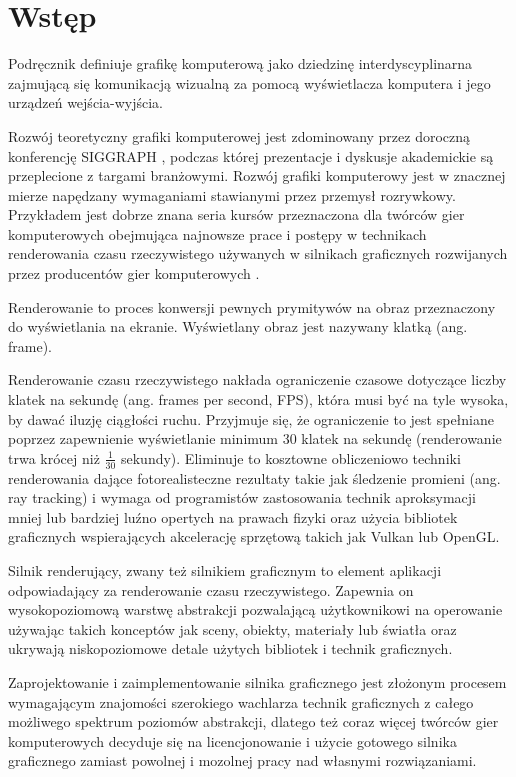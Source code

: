 \chapter{Wstęp}
\label{chap:introduction}

Podręcznik \cite{HughesDamEtAl13} definiuje grafikę komputerową jako dziedzinę interdyscyplinarna zajmującą się komunikacją wizualną za pomocą wyświetlacza komputera i jego urządzeń wejścia-wyjścia.

Rozwój teoretyczny grafiki komputerowej jest zdominowany przez doroczną konferencję SIGGRAPH \cite{SIGGRAPH}, podczas której prezentacje i dyskusje akademickie są przeplecione z targami branżowymi.
Rozwój grafiki komputerowy jest w znacznej mierze napędzany wymaganiami stawianymi przez przemysł rozrywkowy. Przykładem jest dobrze znana seria kursów przeznaczona dla twórców gier komputerowych obejmująca najnowsze prace i postępy w technikach renderowania czasu rzeczywistego używanych w silnikach graficznych rozwijanych przez producentów gier komputerowych \cite{SIGGRAPH_ADVANCES}.

Renderowanie to proces konwersji pewnych prymitywów na obraz przeznaczony do wyświetlania na ekranie.
Wyświetlany obraz jest nazywany klatką (ang. frame).

Renderowanie czasu rzeczywistego nakłada ograniczenie czasowe dotyczące liczby klatek na sekundę (ang. frames per second, FPS), która musi być na tyle wysoka, by dawać iluzję ciągłości ruchu.
Przyjmuje się, że ograniczenie to jest spełniane poprzez zapewnienie wyświetlanie minimum 30 klatek na sekundę (renderowanie trwa krócej niż $\frac{1}{30}$ sekundy).
Eliminuje to kosztowne obliczeniowo techniki renderowania dające fotorealisteczne rezultaty takie jak śledzenie promieni (ang. ray tracking) i wymaga od programistów zastosowania technik aproksymacji mniej lub bardziej luźno opertych na prawach fizyki oraz użycia bibliotek graficznych wspierających akcelerację sprzętową takich jak Vulkan lub OpenGL.

Silnik renderujący, zwany też silnikiem graficznym to element aplikacji odpowiadający za renderowanie czasu rzeczywistego. Zapewnia on wysokopoziomową warstwę abstrakcji pozwalającą użytkownikowi na operowanie używając takich konceptów jak sceny, obiekty, materiały lub światła oraz ukrywają niskopoziomowe detale użytych bibliotek i technik graficznych.

Zaprojektowanie i zaimplementowanie silnika graficznego jest złożonym procesem wymagającym znajomości szerokiego wachlarza technik graficznych z całego możliwego spektrum poziomów abstrakcji, dlatego też coraz więcej twórców gier komputerowych decyduje się na licencjonowanie i użycie gotowego silnika graficznego zamiast powolnej i mozolnej pracy nad własnymi rozwiązaniami.

